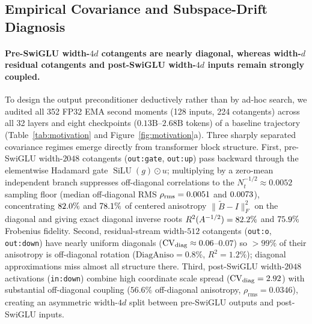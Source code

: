 \subsection{Empirical Covariance and Subspace-Drift Diagnosis}
\label{sec:method-audit}

\paragraph{Pre-SwiGLU width-$4d$ cotangents are nearly diagonal, whereas width-$d$ residual cotangents and post-SwiGLU width-$4d$ inputs remain strongly coupled.}
To design the output preconditioner deductively rather than by ad-hoc search, we
audited all 352 FP32 EMA second moments (128 inputs, 224 cotangents) across all
32 layers and eight checkpoints ($0.13\text{B}$--$2.68\text{B}$ tokens) of a
baseline  trajectory (Table~\ref{tab:motivation} and
Figure~\ref{fig:motivation}a). Three sharply separated covariance regimes emerge
directly from transformer block structure. First, pre-SwiGLU width-$2048$
cotangents (\texttt{out:gate}, \texttt{out:up}) pass backward through the
elementwise Hadamard gate $\operatorname{SiLU}(g)\odot u$; multiplying by a
zero-mean independent branch suppresses off-diagonal correlations to the
$N_t^{-1/2} \approx 0.0052$ sampling floor (median off-diagonal RMS
$\rho_{\mathrm{rms}} = 0.0051{}$ and $0.0073{}$),
concentrating $82.0\%$ and $78.1\%$ of
centered anisotropy $\|\tilde B - I\|_F^2$ on the diagonal and giving exact
diagonal inverse roots $R^2(A^{-1/2}) = 82.2\%$ and
$75.9\%$ Frobenius fidelity. Second, residual-stream
width-$512$ cotangents (\texttt{out:o}, \texttt{out:down}) have nearly uniform
diagonals ($\mathrm{CV}_{\operatorname{diag}} \approx 0.06$--$0.07$) so $>99\%$ of their
anisotropy is off-diagonal rotation ($\mathrm{DiagAniso} = 0.8\%$,
$R^2 = 1.2\%$); diagonal approximations miss almost all structure there. Third,
post-SwiGLU width-$2048$ activations (\texttt{in:down}) combine high coordinate
scale spread ($\mathrm{CV}_{\operatorname{diag}} = 2.92$) with substantial off-diagonal
coupling ($56.6\%$ off-diagonal anisotropy, $\rho_{\mathrm{rms}} = 0.0346$),
creating an asymmetric width-$4d$ split between pre-SwiGLU outputs and
post-SwiGLU inputs.

